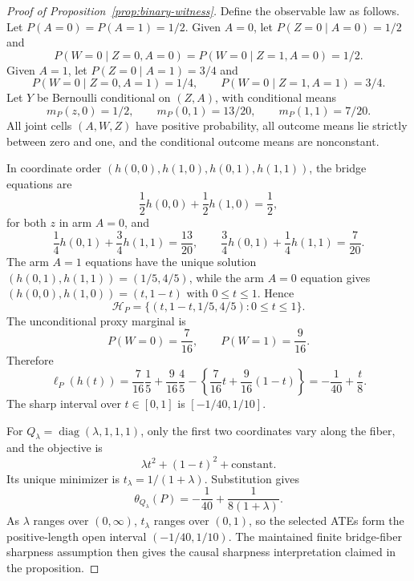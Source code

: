 \documentclass[11pt]{article}
\newcommand{\calH}{\mathcal{H}}
\theoremstyle{definition}
\theoremstyle{plain}
\theoremstyle{remark}
\begin{document}
\begin{proof}[Proof of Proposition~\ref{prop:binary-witness}]
Define the observable law as follows.  Let \(P(A=0)=P(A=1)=1/2\).  Given
\(A=0\), let \(P(Z=0\mid A=0)=1/2\) and
\[
  P(W=0\mid Z=0,A=0)=P(W=0\mid Z=1,A=0)=1/2 .
\]
Given \(A=1\), let \(P(Z=0\mid A=1)=3/4\) and
\[
  P(W=0\mid Z=0,A=1)=1/4,\qquad
  P(W=0\mid Z=1,A=1)=3/4 .
\]
Let \(Y\) be Bernoulli conditional on \((Z,A)\), with conditional means
\[
  m_P(z,0)=1/2,\qquad
  m_P(0,1)=13/20,\qquad
  m_P(1,1)=7/20 .
\]
All joint cells \((A,W,Z)\) have positive probability, all outcome means lie
strictly between zero and one, and the conditional outcome means are
nonconstant.

In coordinate order \((h(0,0),h(1,0),h(0,1),h(1,1))\), the bridge equations
are
\[
  \frac12 h(0,0)+\frac12 h(1,0)=\frac12,
\]
for both \(z\) in arm \(A=0\), and
\[
  \frac14 h(0,1)+\frac34 h(1,1)=\frac{13}{20},
  \qquad
  \frac34 h(0,1)+\frac14 h(1,1)=\frac{7}{20}.
\]
The arm \(A=1\) equations have the unique solution
\((h(0,1),h(1,1))=(1/5,4/5)\), while the arm \(A=0\) equation gives
\((h(0,0),h(1,0))=(t,1-t)\) with \(0\le t\le1\).  Hence
\[
  \calH_P=\{(t,1-t,1/5,4/5):0\le t\le1\}.
\]
The unconditional proxy marginal is
\[
  P(W=0)=\frac{7}{16},\qquad P(W=1)=\frac{9}{16}.
\]
Therefore
\[
  \ell_P(h(t))
  =
  \frac{7}{16}\frac15+\frac{9}{16}\frac45
  -
  \left\{\frac{7}{16}t+\frac{9}{16}(1-t)\right\}
  =
  -\frac1{40}+\frac{t}{8}.
\]
The sharp interval over \(t\in[0,1]\) is
\([-1/40,1/10]\).

For \(Q_\lambda=\operatorname{diag}(\lambda,1,1,1)\), only the first two
coordinates vary along the fiber, and the objective is
\[
  \lambda t^2+(1-t)^2+\text{constant}.
\]
Its unique minimizer is \(t_\lambda=1/(1+\lambda)\).  Substitution gives
\[
  \theta_{Q_\lambda}(P)
  =
  -\frac1{40}+\frac{1}{8(1+\lambda)}.
\]
As \(\lambda\) ranges over \((0,\infty)\), \(t_\lambda\) ranges over
\((0,1)\), so the selected ATEs form the positive-length open interval
\((-1/40,1/10)\).  The maintained finite bridge-fiber sharpness assumption
then gives the causal sharpness interpretation claimed in the proposition.
\end{proof}
\end{document}
